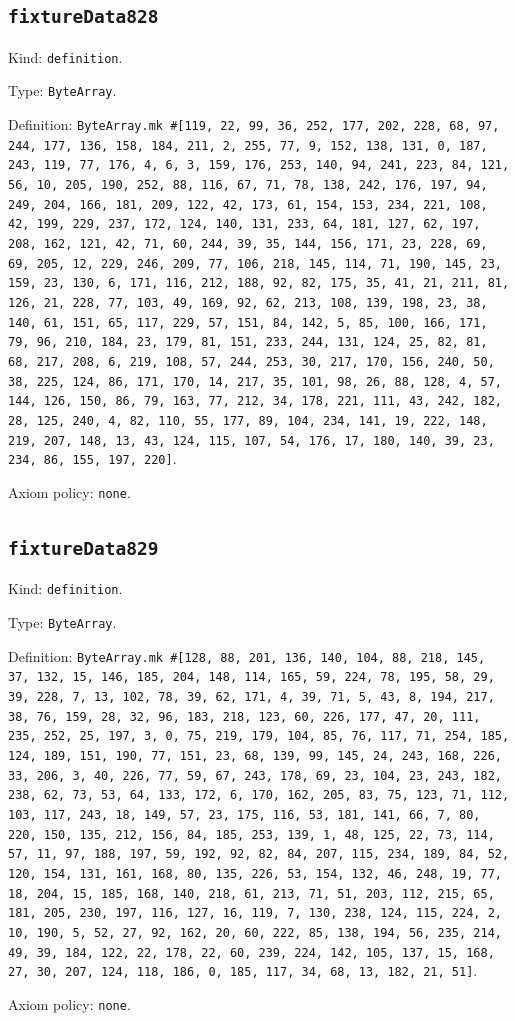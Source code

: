 \documentclass[11pt]{article}
\begin{document}
\subsection*{\texttt{fixtureData828}}
\noindent Kind: \texttt{definition}.\par
\noindent Type: \texttt{ByteArray}.\par
\noindent Definition: \texttt{ByteArray.mk \#[119, 22, 99, 36, 252, 177, 202, 228, 68, 97, 244, 177, 136, 158, 184, 211, 2, 255, 77, 9, 152, 138, 131, 0, 187, 243, 119, 77, 176, 4, 6, 3, 159, 176, 253, 140, 94, 241, 223, 84, 121, 56, 10, 205, 190, 252, 88, 116, 67, 71, 78, 138, 242, 176, 197, 94, 249, 204, 166, 181, 209, 122, 42, 173, 61, 154, 153, 234, 221, 108, 42, 199, 229, 237, 172, 124, 140, 131, 233, 64, 181, 127, 62, 197, 208, 162, 121, 42, 71, 60, 244, 39, 35, 144, 156, 171, 23, 228, 69, 69, 205, 12, 229, 246, 209, 77, 106, 218, 145, 114, 71, 190, 145, 23, 159, 23, 130, 6, 171, 116, 212, 188, 92, 82, 175, 35, 41, 21, 211, 81, 126, 21, 228, 77, 103, 49, 169, 92, 62, 213, 108, 139, 198, 23, 38, 140, 61, 151, 65, 117, 229, 57, 151, 84, 142, 5, 85, 100, 166, 171, 79, 96, 210, 184, 23, 179, 81, 151, 233, 244, 131, 124, 25, 82, 81, 68, 217, 208, 6, 219, 108, 57, 244, 253, 30, 217, 170, 156, 240, 50, 38, 225, 124, 86, 171, 170, 14, 217, 35, 101, 98, 26, 88, 128, 4, 57, 144, 126, 150, 86, 79, 163, 77, 212, 34, 178, 221, 111, 43, 242, 182, 28, 125, 240, 4, 82, 110, 55, 177, 89, 104, 234, 141, 19, 222, 148, 219, 207, 148, 13, 43, 124, 115, 107, 54, 176, 17, 180, 140, 39, 23, 234, 86, 155, 197, 220]}.\par
\noindent Axiom policy: \texttt{none}.\par
\subsection*{\texttt{fixtureData829}}
\noindent Kind: \texttt{definition}.\par
\noindent Type: \texttt{ByteArray}.\par
\noindent Definition: \texttt{ByteArray.mk \#[128, 88, 201, 136, 140, 104, 88, 218, 145, 37, 132, 15, 146, 185, 204, 148, 114, 165, 59, 224, 78, 195, 58, 29, 39, 228, 7, 13, 102, 78, 39, 62, 171, 4, 39, 71, 5, 43, 8, 194, 217, 38, 76, 159, 28, 32, 96, 183, 218, 123, 60, 226, 177, 47, 20, 111, 235, 252, 25, 197, 3, 0, 75, 219, 179, 104, 85, 76, 117, 71, 254, 185, 124, 189, 151, 190, 77, 151, 23, 68, 139, 99, 145, 24, 243, 168, 226, 33, 206, 3, 40, 226, 77, 59, 67, 243, 178, 69, 23, 104, 23, 243, 182, 238, 62, 73, 53, 64, 133, 172, 6, 170, 162, 205, 83, 75, 123, 71, 112, 103, 117, 243, 18, 149, 57, 23, 175, 116, 53, 181, 141, 66, 7, 80, 220, 150, 135, 212, 156, 84, 185, 253, 139, 1, 48, 125, 22, 73, 114, 57, 11, 97, 188, 197, 59, 192, 92, 82, 84, 207, 115, 234, 189, 84, 52, 120, 154, 131, 161, 168, 80, 135, 226, 53, 154, 132, 46, 248, 19, 77, 18, 204, 15, 185, 168, 140, 218, 61, 213, 71, 51, 203, 112, 215, 65, 181, 205, 230, 197, 116, 127, 16, 119, 7, 130, 238, 124, 115, 224, 2, 10, 190, 5, 52, 27, 92, 162, 20, 60, 222, 85, 138, 194, 56, 235, 214, 49, 39, 184, 122, 22, 178, 22, 60, 239, 224, 142, 105, 137, 15, 168, 27, 30, 207, 124, 118, 186, 0, 185, 117, 34, 68, 13, 182, 21, 51]}.\par
\noindent Axiom policy: \texttt{none}.\par
\end{document}
